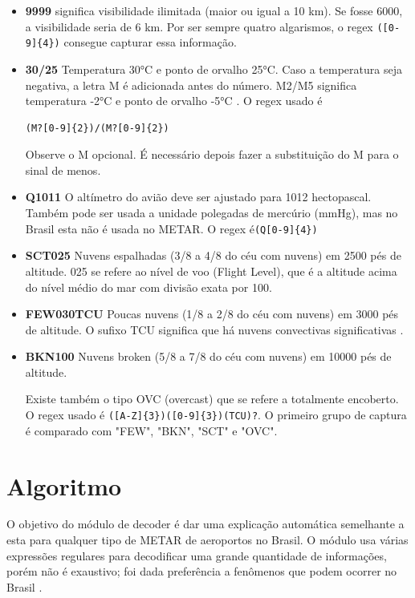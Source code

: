 \begin{itemize}
\item \textbf{9999} significa visibilidade ilimitada (maior ou igual a 10 km). Se fosse 
6000, a visibilidade seria de 
6 km. Por ser sempre quatro algarismos, o regex \verb|([0-9]{4})| consegue capturar 
essa informação.

\item \textbf{30/25} Temperatura 30°C e ponto de orvalho 25°C. Caso a temperatura seja 
negativa, a letra M é adicionada antes do número. M2/M5 significa temperatura 
-2°C e ponto de orvalho -5°C \cite{METAR-help}. O regex usado é

\begin{verbatim}
(M?[0-9]{2})/(M?[0-9]{2})
\end{verbatim}

Observe o M opcional. É necessário depois fazer a substituição do M para o sinal
de menos.

\item \textbf{Q1011} O altímetro do avião deve ser ajustado para 1012 hectopascal. 
Também pode ser usada a unidade polegadas de mercúrio (mmHg), mas no Brasil esta 
não é usada no METAR. O regex é\verb|(Q[0-9]{4})|

\item \textbf{SCT025} Nuvens espalhadas (3/8 a 4/8 do céu com nuvens) em 2500 pés de 
altitude. 025 se refere ao nível de voo (Flight Level), que é a altitude acima 
do nível médio do mar com divisão exata por 100.

\item \textbf{FEW030TCU} Poucas nuvens (1/8 a 2/8 do céu com nuvens) em 3000 pés de 
altitude. O sufixo TCU significa que há nuvens convectivas significativas \cite{decea-mil}.

\item \textbf{BKN100} Nuvens broken (5/8 a 7/8 do céu com nuvens) em 10000 pés de altitude.

Existe também o tipo OVC (overcast) que se refere a totalmente encoberto. O regex 
usado é \verb|([A-Z]{3})([0-9]{3})(TCU)?|. O primeiro grupo de captura é comparado 
com "FEW", "BKN", "SCT" e "OVC".

\end{itemize}

\section{Algoritmo}

O objetivo do módulo de decoder é dar uma explicação automática semelhante a esta 
para qualquer tipo de METAR de aeroportos no Brasil. O módulo usa várias expressões 
regulares para decodificar uma grande quantidade de informações, porém não é exaustivo; 
foi dada preferência a fenômenos que podem ocorrer no Brasil \cite{decea-mil}.

